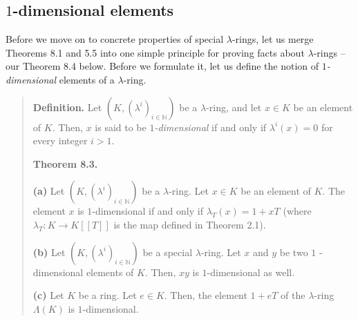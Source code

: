 \documentclass[numbers=enddot,12pt,final,onecolumn,notitlepage]{scrartcl}%
\begin{document}
\subsection{$1$-dimensional elements}

Before we move on to concrete properties of special $\lambda$-rings, let us
merge Theorems 8.1 and 5.5 into one simple principle for proving facts about
$\lambda$-rings -- our Theorem 8.4 below. Before we formulate it, let us
define the notion of $1$\textit{-dimensional} elements of a $\lambda$-ring.

\begin{quote}
\textbf{Definition.} Let $\left(  K,\left(  \lambda^{i}\right)  _{i\in
\mathbb{N}}\right)  $ be a $\lambda$-ring, and let $x\in K$ be an element of
$K$. Then, $x$ is said to be $1$\textit{-dimensional} if and only if
$\lambda^{i}\left(  x\right)  =0$ for every integer $i>1$.

\textbf{Theorem 8.3.}

\textbf{(a)} Let $\left(  K,\left(  \lambda^{i}\right)  _{i\in\mathbb{N}%
}\right)  $ be a $\lambda$-ring. Let $x\in K$ be an element of $K$. The
element $x$ is $1$-dimensional if and only if $\lambda_{T}\left(  x\right)
=1+xT$ (where $\lambda_{T}:K\rightarrow K\left[  \left[  T\right]  \right]  $
is the map defined in Theorem 2.1).

\textbf{(b)} Let $\left(  K,\left(  \lambda^{i}\right)  _{i\in\mathbb{N}%
}\right)  $ be a special $\lambda$-ring. Let $x$ and $y$ be two $1$%
-dimensional elements of $K$. Then, $xy$ is $1$-dimensional as well.

\textbf{(c)} Let $K$ be a ring. Let $e\in K$. Then, the element $1+eT$ of the
$\lambda$-ring $\Lambda\left(  K\right)  $ is $1$-dimensional.
\end{quote}
\end{document}

